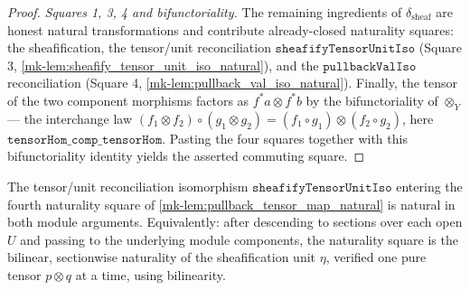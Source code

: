 \begin{proof}
  \emph{Squares 1, 3, 4 and bifunctoriality.} The remaining ingredients of
  \(\delta_{\mathrm{sheaf}}\) are honest natural transformations and contribute already-closed
  naturality squares: the sheafification, the tensor/unit reconciliation
  \(\mathtt{sheafifyTensorUnitIso}\) (Square 3, \ref{mk-lem:sheafify_tensor_unit_iso_natural}),
  and the \(\mathtt{pullbackValIso}\) reconciliation (Square 4,
  \ref{mk-lem:pullback_val_iso_natural}). Finally, the tensor of the two component morphisms
  factors as \(f^*a \otimes f^*b\) by the bifunctoriality of \(\otimes_Y\) --- the interchange
  law \((f_1 \otimes f_2) \circ (g_1 \otimes g_2) = (f_1 \circ g_1) \otimes (f_2 \circ g_2)\),
  here \(\mathtt{tensorHom\_comp\_tensorHom}\). Pasting the four squares together with this
  bifunctoriality identity yields the asserted commuting square.
\end{proof}

\begin{lemma}\label{mk-lem:sheafify_tensor_unit_iso_natural}
  \leanok

  The tensor/unit reconciliation isomorphism \(\mathtt{sheafifyTensorUnitIso}\) entering the
  fourth naturality square of \ref{mk-lem:pullback_tensor_map_natural} is natural in both
  module arguments. Equivalently: after descending to sections over each open \(U\) and
  passing to the underlying module components, the naturality square is the
  bilinear, sectionwise naturality of the sheafification unit \(\eta\), verified one pure
  tensor \(p \otimes q\) at a time, using bilinearity.
\end{lemma}

